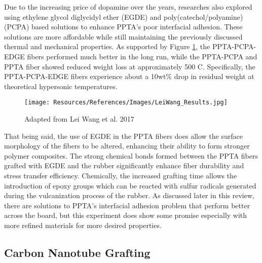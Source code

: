 \documentclass[12pt]{article}
\begin{document}
\begin{multicols}{2}
\indent Due to the increasing price of dopamine over the years, researches also explored using ethylene glycol diglycidyl ether (EGDE) and poly(catechol/polyamine) (PCPA) based solutions to enhance PPTA's poor interfacial adhesion. \citep{LeiWang2017} These solutions are more affordable while still maintaining the previously discussed thermal and mechanical properties. As supported by Figure \ref{fig:LeiWang_Results}, the PPTA-PCPA-EDGE fibers performed much better in the long run, while the PPTA-PCPA and PPTA fiber showed reduced weight loss at approximately 500 \degree C. Specifically, the PPTA-PCPA-EDGE fibers experience about a 10wt\% drop in residual weight at theoretical hypersonic temperatures.

\begin{figure}[H]
    \centering
    \texttt{[image: Resources/References/Images/LeiWang\_Results.jpg]}
    \caption{\scriptsize{Adapted from Lei Wang et al. 2017 \citep{LeiWang2017}}}
    \label{fig:LeiWang_Results}
\end{figure}

\indent That being said, the use of EGDE in the PPTA fibers does allow the surface morphology of the fibers to be altered, enhancing their ability to form stronger polymer composites. The strong chemical bonds formed between the PPTA fibers grafted with EGDE and the rubber significantly enhance fiber durability and stress transfer efficiency. \citep{Kong2018} Chemically, the increased grafting time allows the introduction of epoxy groups which can be reacted with sulfur radicals generated during the vulcanization process of the rubber. \citep{Zhang2012} As discussed later in this review, there are solutions to PPTA's interfacial adhesion problem that perform better across the board, but this experiment does show some promise especially with more refined materials for more desired properties.

\subsection{Carbon Nanotube Grafting}


\end{multicols}
\end{document}
